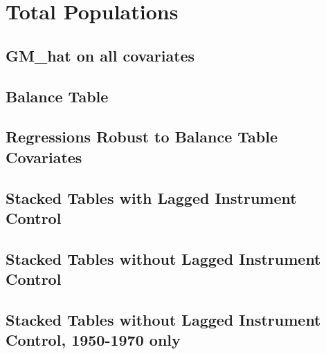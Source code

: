 \documentclass{article}
\begin{document}
\section{Total Populations}
\subsection{GM\_hat on all covariates}

\clearpage
\subsection{Balance Table}

\clearpage
\subsection{Regressions Robust to Balance Table Covariates}
\begin{landscape}

\clearpage

\clearpage

\clearpage

\clearpage
\end{landscape}



\subsection{Stacked Tables with Lagged Instrument Control}



\clearpage


\clearpage

\subsection{Stacked Tables without Lagged Instrument Control}


\clearpage


\clearpage

\subsection{Stacked Tables without Lagged Instrument Control, 1950-1970 only}


\clearpage


\clearpage
\end{document}
